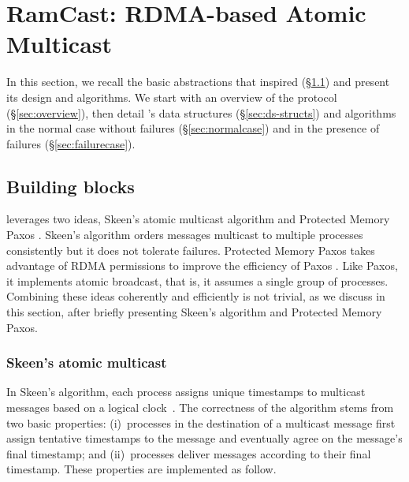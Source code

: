 
\section{RamCast: RDMA-based Atomic Multicast}
\label{sec:rdma-atomic-multicast}

In this section, we recall the basic abstractions that inspired \libname (\S\ref{sec:bblocks}) and present its design and algorithms. 
We start with an overview of the protocol (\S\ref{sec:overview}), then detail \libname's data structures (\S\ref{sec:ds-structs}) and algorithms in the normal case without failures (\S\ref{sec:normalcase}) and in the presence of failures (\S\ref{sec:failurecase}).

\subsection{Building blocks}
\label{sec:bblocks}

\libname leverages two ideas, Skeen's atomic multicast algorithm \cite{BJ87b} and Protected Memory Paxos \cite{Aguilera2019}.
Skeen's algorithm orders messages multicast to multiple processes consistently but it does not tolerate failures.
Protected Memory Paxos takes advantage of RDMA permissions to improve the efficiency of Paxos \cite{L98}. 
Like Paxos, it implements atomic broadcast, that is, it assumes a single group of processes.
Combining these ideas coherently and efficiently is not trivial, as we discuss in this section,
after briefly presenting Skeen's algorithm and Protected Memory Paxos.


\subsubsection{Skeen's atomic multicast}

In Skeen's algorithm, each process assigns unique timestamps to multicast messages based on a logical clock~\cite{Lam78}.
The correctness of the algorithm stems from two basic properties:
(i)~processes in the destination of a multicast message first assign tentative timestamps to the message and eventually agree on the message's final timestamp; and
(ii)~processes deliver messages according to their final timestamp.
These properties are implemented as follow.

